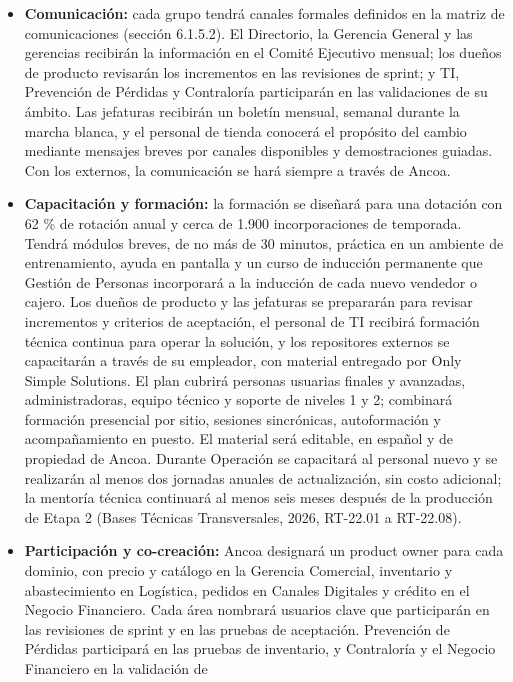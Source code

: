 \documentclass[11pt]{article}
\begin{document}
\begin{itemize}
\item
  \textbf{Comunicación:} cada grupo tendrá canales formales definidos en
  la matriz de comunicaciones (sección 6.1.5.2). El Directorio, la
  Gerencia General y las gerencias recibirán la información en el Comité
  Ejecutivo mensual; los dueños de producto revisarán los incrementos en
  las revisiones de sprint; y TI, Prevención de Pérdidas y Contraloría
  participarán en las validaciones de su ámbito. Las jefaturas recibirán
  un boletín mensual, semanal durante la marcha blanca, y el personal de
  tienda conocerá el propósito del cambio mediante mensajes breves por
  canales disponibles y demostraciones guiadas. Con los externos, la
  comunicación se hará siempre a través de Ancoa.
\item
  \textbf{Capacitación y formación:} la formación se diseñará para una
  dotación con 62 \% de rotación anual y cerca de 1.900 incorporaciones
  de temporada. Tendrá módulos breves, de no más de 30 minutos, práctica
  en un ambiente de entrenamiento, ayuda en pantalla y un curso de
  inducción permanente que Gestión de Personas incorporará a la
  inducción de cada nuevo vendedor o cajero. Los dueños de producto y
  las jefaturas se prepararán para revisar incrementos y criterios de
  aceptación, el personal de TI recibirá formación técnica continua para
  operar la solución, y los repositores externos se capacitarán a través
  de su empleador, con material entregado por Only Simple Solutions. El
  plan cubrirá personas usuarias finales y avanzadas, administradoras,
  equipo técnico y soporte de niveles 1 y 2; combinará formación
  presencial por sitio, sesiones sincrónicas, autoformación y
  acompañamiento en puesto. El material será editable, en español y de
  propiedad de Ancoa. Durante Operación se capacitará al personal nuevo
  y se realizarán al menos dos jornadas anuales de actualización, sin
  costo adicional; la mentoría técnica continuará al menos seis meses
  después de la producción de Etapa 2 (Bases Técnicas Transversales,
  2026, RT-22.01 a RT-22.08).
\item
  \textbf{Participación y co-creación:} Ancoa designará un product owner
  para cada dominio, con precio y catálogo en la Gerencia Comercial,
  inventario y abastecimiento en Logística, pedidos en Canales Digitales
  y crédito en el Negocio Financiero. Cada área nombrará usuarios clave
  que participarán en las revisiones de sprint y en las pruebas de
  aceptación. Prevención de Pérdidas participará en las pruebas de
  inventario, y Contraloría y el Negocio Financiero en la validación de

\end{itemize}
\end{document}

